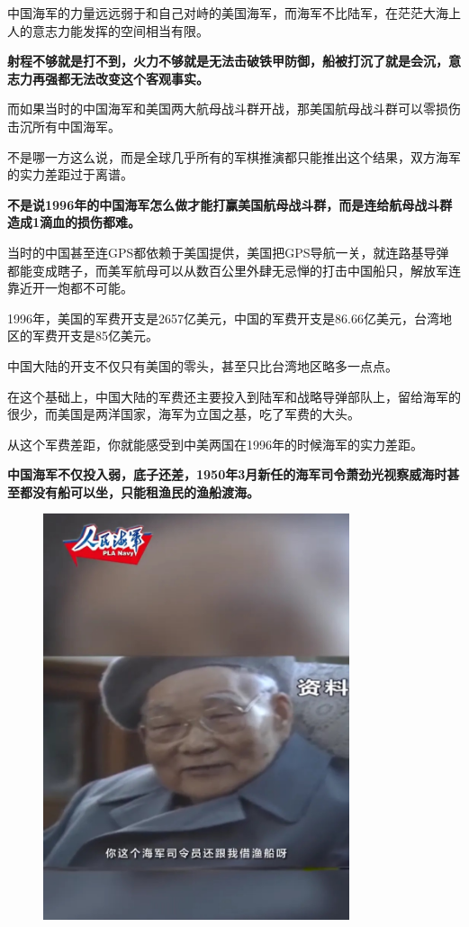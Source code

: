 \documentclass[UTF8, 11pt, oneside]{ctexart}
\newcommand{\zd}[1]{\textbf{\textcolor[RGB]{123,12,0}{#1}}} %
\begin{document}
中国海军的力量远远弱于和自己对峙的美国海军，而海军不比陆军，在茫茫大海上人的意志力能发挥的空间相当有限。

\zd{射程不够就是打不到，火力不够就是无法击破铁甲防御，船被打沉了就是会沉，意志力再强都无法改变这个客观事实。}

而如果当时的中国海军和美国两大航母战斗群开战，那美国航母战斗群可以零损伤击沉所有中国海军。

不是哪一方这么说，而是全球几乎所有的军棋推演都只能推出这个结果，双方海军的实力差距过于离谱。

\zd{不是说1996年的中国海军怎么做才能打赢美国航母战斗群，而是连给航母战斗群造成1滴血的损伤都难。}

当时的中国甚至连GPS都依赖于美国提供，美国把GPS导航一关，就连路基导弹都能变成瞎子，而美军航母可以从数百公里外肆无忌惮的打击中国船只，解放军连靠近开一炮都不可能。

1996年，美国的军费开支是2657亿美元，中国的军费开支是86.66亿美元，台湾地区的军费开支是85亿美元。

中国大陆的开支不仅只有美国的零头，甚至只比台湾地区略多一点点。

在这个基础上，中国大陆的军费还主要投入到陆军和战略导弹部队上，留给海军的很少，而美国是两洋国家，海军为立国之基，吃了军费的大头。

从这个军费差距，你就能感受到中美两国在1996年的时候海军的实力差距。

\zd{中国海军不仅投入弱，底子还差，1950年3月新任的海军司令萧劲光视察威海时甚至都没有船可以坐，只能租渔民的渔船渡海。}

\begin{figure}[H]
    \centering
    \includegraphics[width=9cm]{2024-08-18-002.jpg}
\end{figure}
\end{document}
